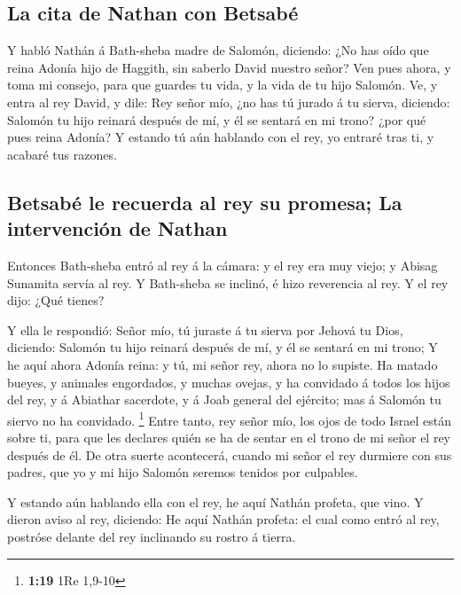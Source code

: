 \hypertarget{la-cita-de-nathan-con-betsabuxe9}{%
\subsection{La cita de Nathan con
Betsabé}\label{la-cita-de-nathan-con-betsabuxe9}}

 Y habló Nathán á Bath-sheba madre de Salomón, diciendo:
¿No has oído que reina Adonía hijo de Haggith, sin saberlo David nuestro
señor?  Ven pues ahora, y toma mi consejo, para que
guardes tu vida, y la vida de tu hijo Salomón.  Ve, y
entra al rey David, y dile: Rey señor mío, ¿no has tú jurado á tu
sierva, diciendo: Salomón tu hijo reinará después de mí, y él se sentará
en mi trono? ¿por qué pues reina Adonía?  Y estando tú
aún hablando con el rey, yo entraré tras ti, y acabaré tus razones.

\hypertarget{betsabuxe9-le-recuerda-al-rey-su-promesa-la-intervenciuxf3n-de-nathan}{%
\subsection{Betsabé le recuerda al rey su promesa; La intervención de
Nathan}\label{betsabuxe9-le-recuerda-al-rey-su-promesa-la-intervenciuxf3n-de-nathan}}

 Entonces Bath-sheba entró al rey á la cámara: y el rey
era muy viejo; y Abisag Sunamita servía al rey.  Y
Bath-sheba se inclinó, é hizo reverencia al rey. Y el rey dijo: ¿Qué
tienes?

 Y ella le respondió: Señor mío, tú juraste á tu sierva
por Jehová tu Dios, diciendo: Salomón tu hijo reinará después de mí, y
él se sentará en mi trono;  Y he aquí ahora Adonía reina:
y tú, mi señor rey, ahora no lo supiste.  Ha matado
bueyes, y animales engordados, y muchas ovejas, y ha convidado á todos
los hijos del rey, y á Abiathar sacerdote, y á Joab general del
ejército; mas á Salomón tu siervo no ha convidado. \footnote{\textbf{1:19}
  1Re 1,9-10}  Entre tanto, rey señor mío, los ojos de
todo Israel están sobre ti, para que les declares quién se ha de sentar
en el trono de mi señor el rey después de él.  De otra
suerte acontecerá, cuando mi señor el rey durmiere con sus padres, que
yo y mi hijo Salomón seremos tenidos por culpables.

 Y estando aún hablando ella con el rey, he aquí Nathán
profeta, que vino.  Y dieron aviso al rey, diciendo: He
aquí Nathán profeta: el cual como entró al rey, postróse delante del rey
inclinando su rostro á tierra.

